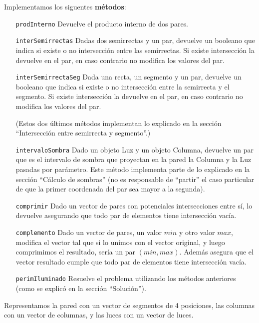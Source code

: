 Implementamos los siguentes {\bf métodos}:

\begin{itemize}
\item[\tt\small prodInterno] Devuelve el producto interno de dos pares.

\item[\tt\small interSemirrectas] Dadas dos semirrectas y un par, devuelve un
booleano que indica si existe o no intersección entre las semirrectas. Si
existe intersección la devuelve en el par, en caso contrario no modifica
los valores del par.

\item[\tt\small interSemirrectaSeg] Dada una recta, un segmento y un par, devuelve
un booleano que indica si existe o no intersección entre la semirrecta y
el segmento. Si existe intersección la devuelve en el par, en caso contrario no
modifica los valores del par.

(Estos dos últimos métodos implementan lo explicado en la sección ``Intersección
entre semirrecta y segmento''.)

\item[\tt\small intervaloSombra] Dado un objeto Luz y un objeto Columna, devuelve
un par que es el intervalo de sombra que proyectan en la pared la Columna y la Luz
pasadas por parámetro. Este método implementa parte de lo explicado en la sección
``Cálculo de sombras'' (no es responsable de ``partir'' el caso particular de
que la primer coordenada del par sea mayor a la segunda).

\item[\tt\small comprimir] Dado un vector de pares con potenciales
intersecciones entre sí, lo devuelve asegurando que todo par de elementos tiene
intersección vacía.

\item[\tt\small complemento] Dado un vector de pares, un valor $min$ y otro
valor $max$, modifica el vector tal que si lo unimos con el vector original,
y luego comprimimos el resultado, sería un par $(min,max)$. Además asegura
que el vector resultado cumple que todo par de elementos tiene intersección
vacía.

\item[\tt\small perimIluminado] Resuelve el problema utilizando los métodos
anteriores (como se explicó en la sección ``Solución'').

\end{itemize}

Representamos la pared con un vector de segmentos de 4 posiciones, las columnas
con un vector de columnas, y las luces con un vector de luces.


